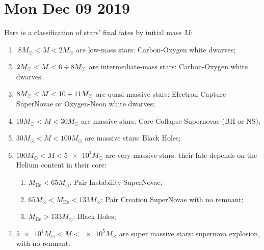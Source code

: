 \documentclass[main.tex]{subfiles}
\begin{document}
\section*{Mon Dec 09 2019}


Here is a classification of stars' final fates by initial mass \(M\): 
\begin{enumerate}
    \item \(\num{.8} M_{\odot} < M < \num{2} M_{\odot}\) are low-mass stars: Carbon-Oxygen white dwarves;
    \item \(\num{2} M_{\odot} < M < 6 \divisionsymbol 8 M_{\odot}\) are intermediate-mass stars: Carbon-Oxygen white dwarves;
    \item \(\num{8} M_{\odot} < M < 10 \divisionsymbol 11 M_{\odot}\) are quasi-massive stars: Electron Capture SuperNovae or Oxygen-Neon white dwarves;
    \item \(10 M_{\odot} < M < 30 M_{\odot}\) are massive stars: Core Collapse Supernovae (BH or NS);
    \item \(30 M_{\odot} < M < 100 M_{\odot}\) are massive stars: Black Holes;
    \item \(100 M_{\odot} < M < \num{5e4} M_{\odot}\) are very massive stars: their fate depends on the Helium content in their core: \begin{enumerate}
        \item \(M _{\text{He}} < 65 M_{\odot}\): Pair Instability SuperNovae;
        \item \(65 M_{\odot} < M _{\text{He}} < 133 M_{\odot}\): Pair Creation SuperNovae with no remnant;
        \item \(M _{\text{He}} > 133 M_{\odot}\): Black Holes;
    \end{enumerate}
    \item \(\num{5e4} M_{\odot} < M < \num{e5} M_{\odot}\)  are super massive stars: supernova explosion, with no remnant.
\end{enumerate}



\end{document}
